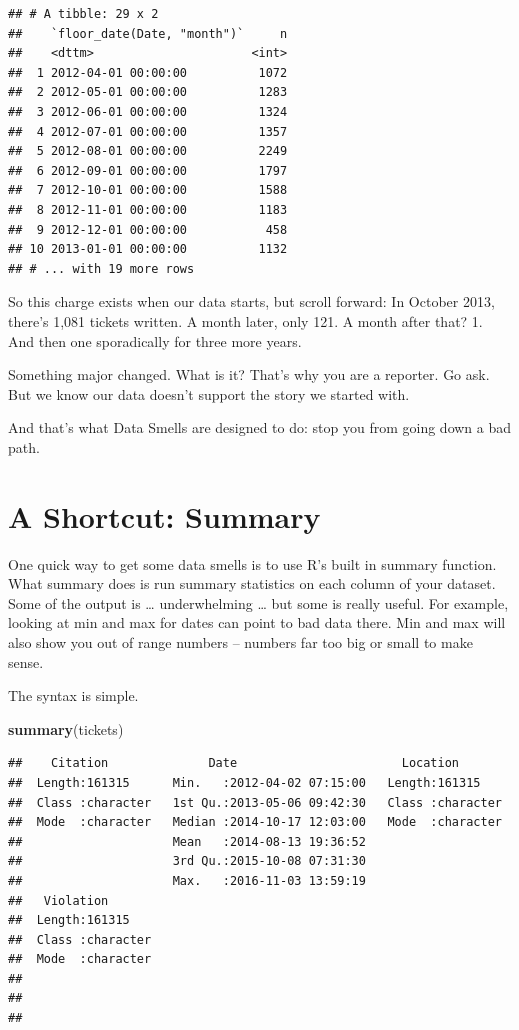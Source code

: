\documentclass[]{book}
\newenvironment{Shaded}{\begin{snugshade}}{\end{snugshade}}
\newcommand{\KeywordTok}[1]{\textcolor[rgb]{0.13,0.29,0.53}{\textbf{#1}}}
\newcommand{\NormalTok}[1]{#1}
\begin{document}
\begin{verbatim}
## # A tibble: 29 x 2
##    `floor_date(Date, "month")`     n
##    <dttm>                      <int>
##  1 2012-04-01 00:00:00          1072
##  2 2012-05-01 00:00:00          1283
##  3 2012-06-01 00:00:00          1324
##  4 2012-07-01 00:00:00          1357
##  5 2012-08-01 00:00:00          2249
##  6 2012-09-01 00:00:00          1797
##  7 2012-10-01 00:00:00          1588
##  8 2012-11-01 00:00:00          1183
##  9 2012-12-01 00:00:00           458
## 10 2013-01-01 00:00:00          1132
## # ... with 19 more rows
\end{verbatim}

So this charge exists when our data starts, but scroll forward: In October 2013, there's 1,081 tickets written. A month later, only 121. A month after that? 1. And then one sporadically for three more years.

Something major changed. What is it? That's why you are a reporter. Go ask. But we know our data doesn't support the story we started with.

And that's what Data Smells are designed to do: stop you from going down a bad path.

\hypertarget{a-shortcut-summary}{%
\section{A Shortcut: Summary}\label{a-shortcut-summary}}

One quick way to get some data smells is to use R's built in summary function. What summary does is run summary statistics on each column of your dataset. Some of the output is \ldots{} underwhelming \ldots{} but some is really useful. For example, looking at min and max for dates can point to bad data there. Min and max will also show you out of range numbers -- numbers far too big or small to make sense.

The syntax is simple.

\begin{Shaded}
\begin{Highlighting}[]
\KeywordTok{summary}\NormalTok{(tickets)}
\end{Highlighting}
\end{Shaded}

\begin{verbatim}
##    Citation              Date                       Location        
##  Length:161315      Min.   :2012-04-02 07:15:00   Length:161315     
##  Class :character   1st Qu.:2013-05-06 09:42:30   Class :character  
##  Mode  :character   Median :2014-10-17 12:03:00   Mode  :character  
##                     Mean   :2014-08-13 19:36:52                     
##                     3rd Qu.:2015-10-08 07:31:30                     
##                     Max.   :2016-11-03 13:59:19                     
##   Violation        
##  Length:161315     
##  Class :character  
##  Mode  :character  
##                    
##                    
## 
\end{verbatim}
\end{document}
